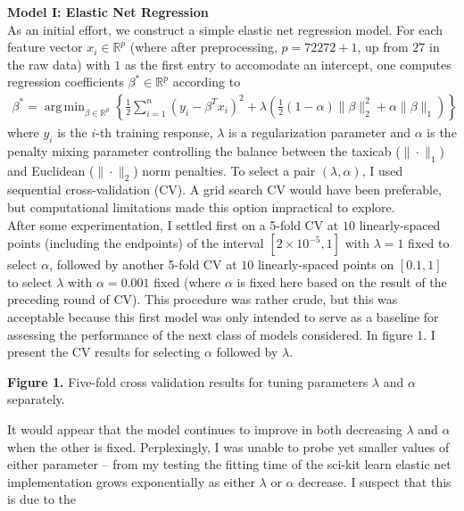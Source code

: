 \documentclass[11pt]{article}
\newcommand{\bp}[1]{\left({#1}\right)}
\newcommand{\mbb}[1]{\mathbb{#1}}
\newcommand{\1}[1]{\mathbbm{1}_{#1}}
\DeclareMathOperator{\argmin}{arg\,min}
\begin{document}
{\bf\large Model I: Elastic Net Regression}\\[5pt]
As an initial effort, we construct a simple elastic net regression model. For each feature vector $x_i\in\mbb{R}^p$ (where after preprocessing, $p=72272+1$, up from $27$ in the raw data) with $1$ as the first entry to accomodate an intercept, one computes regression coefficients $\beta^\ast\in\mbb{R}^p$ according to
\begin{align*}
    \beta^\ast=\argmin_{\beta\in\mbb{R}^p}\left\{\frac{1}{2}\sum_{i=1}^n(y_i-\beta^Tx_i)^2+\lambda\bp{\tfrac{1}{2}(1-\alpha)\|\beta\|^2_2+\alpha\|\beta\|_1}\right\}
\end{align*}
where $y_i$ is the $i$-th training response, $\lambda$ is a regularization parameter and $\alpha$ is the penalty mixing parameter controlling the balance between the taxicab ($\|\cdot\|_1$) and Euclidean ($\|\cdot\|_2$) norm penalties. To select a pair $(\lambda,\alpha)$, I used sequential cross-validation (CV).
A grid search CV would have been preferable, but computational limitations made this option impractical to explore.\\[5pt]
After some experimentation, I settled first on a 5-fold CV at $10$ linearly-spaced points (including the endpoints) of the interval $[2\times10^{-5},1]$ with $\lambda=1$ fixed to select $\alpha$, followed by another 5-fold CV at $10$ linearly-spaced points on $[0.1,1]$ to select $\lambda$ with $\alpha=0.001$ fixed (where $\alpha$ is fixed here based on the 
result of the preceding round of CV). This procedure was rather crude, but this was acceptable because this first model was only intended to serve as a baseline for assessing the performance of the next class of models considered. In figure 1. I present the CV results for selecting $\alpha$ followed by $\lambda$.\\[5pt]
\begin{center}
\end{center}
\begin{center}
    \begin{minipage}{\dimexpr\paperwidth-5cm}
        {\bf Figure 1.} Five-fold cross validation results for tuning parameters $\lambda$ and $\alpha$ separately.
    \end{minipage}
\end{center}
It would appear that the model continues to improve in both decreasing $\lambda$ and $\alpha$ when the other is fixed. Perplexingly, I was unable to probe yet smaller values of either parameter -- from my testing the fitting time of the sci-kit learn elastic net implementation grows exponentially as either $\lambda$ or $\alpha$ decrease. I suspect that this is due to the
\end{document}
